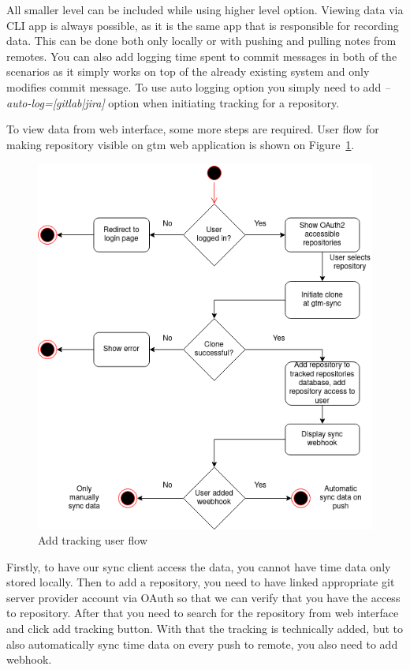 All smaller level can be included while using higher level option.
Viewing data via CLI app is always possible, as it is the same app that is responsible for recording data.
This can be done both only locally or with pushing and pulling notes from remotes.
You can also add logging time spent to commit messages in both of the scenarios as it simply works on top of the already
existing system and only modifies commit message.
To use auto logging option you simply need to add \textit{--auto-log=[gitlab|jira]} option when initiating tracking for a repository.

To view data from web interface, some more steps are required.
User flow for making repository visible on gtm web application is shown on Figure~\ref{fig:add-tracking-user-flow}.

\begin{figure}[h]
    \includegraphics[width=\textwidth]{figures/add_repo_user_flow}
    \caption{Add tracking user flow}
    \label{fig:add-tracking-user-flow}
\end{figure}

Firstly, to have our sync client access the data, you cannot have time data only stored locally.
Then to add a repository, you need to have linked appropriate git server provider account via OAuth so that we can
verify that you have the access to repository.
After that you need to search for the repository from web interface and click add tracking button.
With that the tracking is technically added, but to also automatically sync time data on every push to remote,
you also need to add webhook.

